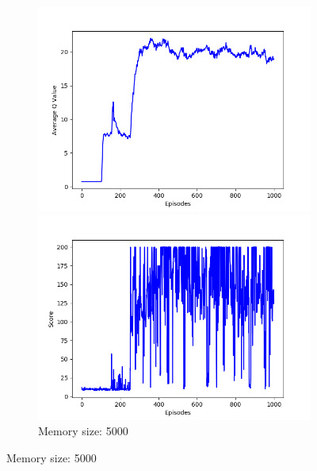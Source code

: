 \documentclass{article}
\begin{document}
\begin{figure}[!htbp]
  \centering
  \begin{subfigure}{\textwidth}
    \begin{minipage}{0.5\textwidth}
      \centering
      \includegraphics[scale=0.45]{../experiments/mem_size_5000/qvalues.png}
    \end{minipage}
    \begin{minipage}{0.5\textwidth}
      \centering
      \includegraphics[scale=0.45]{../experiments/mem_size_5000/scores.png}
    \end{minipage}
    \caption{Memory size: 5000}
  \end{subfigure}%


\end{figure}
\end{document}
